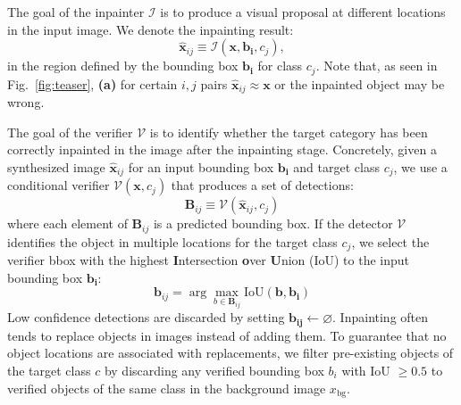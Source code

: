 


 The goal of the inpainter $\mathcal{I}$ is to produce a visual proposal at different locations in the input image. We denote the inpainting result:
\begin{equation}
\mathbf{\hat{x}}_{ij}\equiv \mathcal{I}(\mathbf{x}, \mathbf{b_i}, c_j),   
\end{equation}
in the region defined by the bounding box $\mathbf{b_i}$ for class $c_j$. Note that, as seen in Fig.~\ref{fig:teaser}, \textbf{(a)} for certain $i,j$ pairs $\mathbf{\hat{x}}_{ij} \approx \mathbf{x}$ or the inpainted object may be wrong.


 The goal of the verifier $\mathcal{V}$ is to identify whether the target category has been correctly inpainted in the image after the inpainting stage. Concretely, given a synthesized image $\hat{\mathbf{x}}_{ij}$ for an input bounding box $\mathbf{b_i}$ and target class $c_j$, we use a conditional verifier $\mathcal{V}(\mathbf{x}, c_j)$ that produces a set of detections:
\begin{equation}
\mathbf{B}_{ij} \equiv \mathcal{V}(\hat{\mathbf{x}}_{ij}, c_j)
\end{equation}
\noindent where each element of $\mathbf{B}_{ij}$ is a predicted bounding box. If the detector $\mathcal{V}$ identifies the object in multiple locations for the target class $c_j$, we select the verifier bbox with the highest \textbf{I}ntersection \textbf{o}ver \textbf{U}nion (IoU) to the input bounding box $\mathbf{b_i}$:
\begin{equation}
\mathbf{b}_{ij} = \arg\max_{b \in \mathbf{B}_{ij}} \text{IoU}(\mathbf{b}, \mathbf{b_i})
\end{equation}
\noindent Low confidence detections are discarded by setting $\mathbf{b_{ij}} \leftarrow \varnothing$. Inpainting often tends to replace objects in images instead of adding them. To guarantee that no object locations are associated with replacements, we filter pre-existing objects of the target class $c$ by discarding any verified bounding box $b_i$ with IoU $\geq 0.5$ to verified objects of the same class in the background image $x_{\text{bg}}$.

